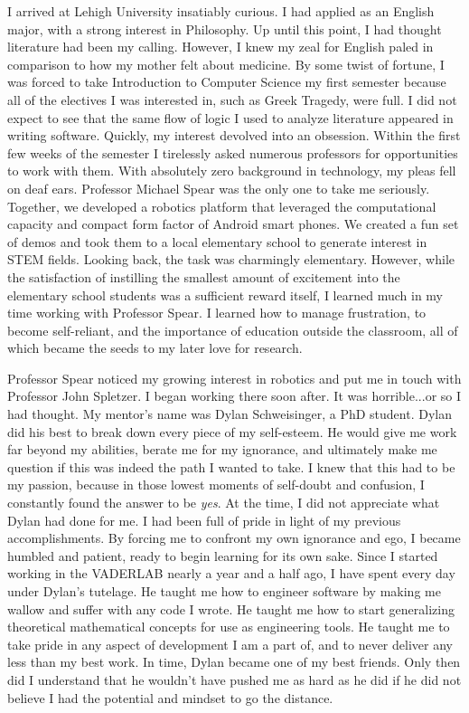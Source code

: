 \documentclass[10pt]{article}
\begin{document}
I arrived at Lehigh University insatiably curious. I had applied as an English
major, with a strong interest in Philosophy.  Up until this point, I had
thought literature had been my calling. However, I knew my zeal for English
paled in comparison to how my mother felt about medicine. By some twist of
fortune, I was forced to take Introduction to Computer Science my first
semester because all of the electives I was interested in, such as Greek
Tragedy, were full. I did not expect to see that the same flow of logic I used
to analyze literature appeared in writing software. Quickly, my interest
devolved into an obsession.  Within the first few weeks of the semester I
tirelessly asked numerous professors for opportunities to work with them.  With
absolutely zero background in technology, my pleas fell on deaf ears.
Professor Michael Spear was the only one to take me seriously. Together, we
developed a robotics platform that leveraged the computational capacity and
compact form factor of Android smart phones. We created a fun set of demos and
took them to a local elementary school to generate interest in STEM fields.
Looking back, the task was charmingly elementary. However, while the
satisfaction of instilling the smallest amount of excitement into the
elementary school students was a sufficient reward itself, I learned much in my
time working with Professor Spear.  I learned how to manage frustration, to
become self-reliant, and the importance of education outside the classroom, all
of which became the seeds to my later love for research.

Professor Spear noticed my growing interest in robotics and put me in touch
with Professor John Spletzer. I began working there soon after. It was
horrible...or so I had thought. My mentor's name was Dylan Schweisinger, a PhD
student. Dylan did his best to break down every piece of my self-esteem. He
would give me work far beyond my abilities, berate me for my ignorance, and
ultimately make me question if this was indeed the path I wanted to take. I
knew that this had to be my passion, because in those lowest moments of
self-doubt and confusion, I constantly found the answer to be \emph{yes}. At
the time, I did not appreciate what Dylan had done for me. I had been full of
pride in light of my previous accomplishments. By forcing me to confront my own
ignorance and ego, I became humbled and patient, ready to begin learning for
its own sake. Since I started working in the VADERLAB nearly a year and a half
ago, I have spent every day under Dylan's tutelage.  He taught me how to
engineer software by making me wallow and suffer with any code I wrote. He
taught me how to start generalizing theoretical mathematical concepts for use
as engineering tools. He taught me to take pride in any aspect of development I
am a part of, and to never deliver any less than my best work. In time, Dylan
became one of my best friends. Only then did I understand that he wouldn't have
pushed me as hard as he did if he did not believe I had the potential and
mindset to go the distance.
\end{document}
